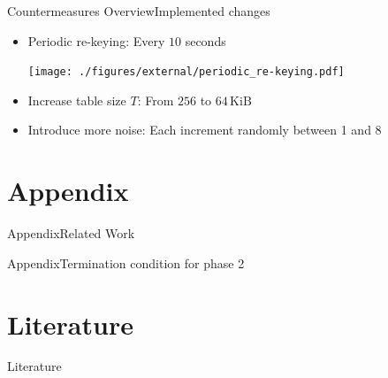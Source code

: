 \documentclass[aspectratio=169, hyperref={colorlinks=true, allcolors=SecondaryColor}, c]{beamer}
\begin{document}
	\begin{frame}[fragile]{Countermeasures Overview}{Implemented changes}
		\begin{itemize}
			\item \alert{Periodic re-keying}: Every $10$ seconds

			\texttt{[image: ./figures/external/periodic\_re-keying.pdf]} %
			\item \alert{Increase table size $T$}: From $256$ to $64\,\text{KiB}$

			\item \alert{Introduce more noise}: Each increment randomly between 1 and 8

		\end{itemize}
	\end{frame}
\else
\fi

\ifappendix
	\section{Appendix}

	\begin{frame}[fragile]{Appendix}{Related Work}
	\end{frame}

	\begin{frame}[fragile]{Appendix}{Termination condition for phase 2}
	\end{frame}
\else
\fi

\ifliterature
	\section{Literature}

	\begin{frame}[allowframebreaks]{Literature}
		\printbibliography
	\end{frame}
\end{document}
